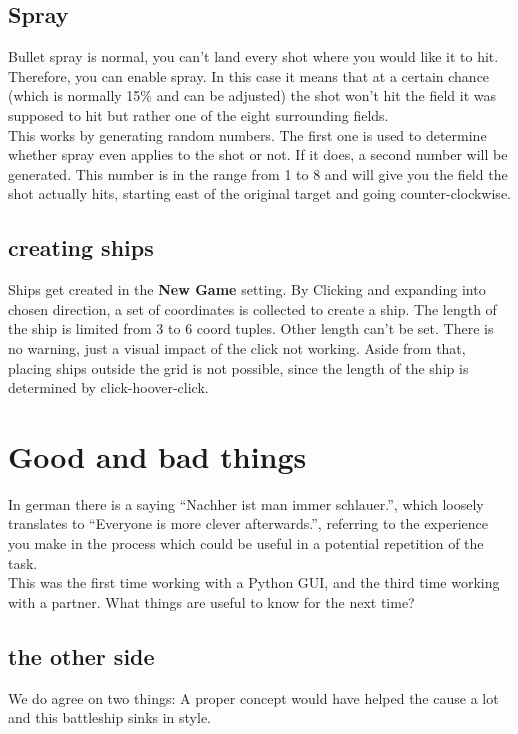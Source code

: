 \documentclass[12pt]{scrartcl}
\begin{document}
	\subsection{Spray}
	Bullet spray is normal, you can't land every shot where you would like it to hit. Therefore, you can enable spray. In this case it means that at a certain chance (which is normally 15\% and can be adjusted) the shot won't hit the field it was supposed to hit but rather one of the eight surrounding fields. \\
	This works by generating random numbers. The first one is used to determine whether spray even applies to the shot or not. If it does, a second number will be generated. This number is in the range from 1 to 8 and will give you the field the shot actually hits, starting east of the original target and going counter-clockwise.
	
	\subsection{creating ships}
	Ships get created in the \textbf{New Game } setting. By Clicking and expanding into chosen direction, a set of coordinates is collected to create a ship. The length of the ship is limited from 3 to 6 coord tuples. Other length can't be set. There is no warning, just a visual impact of the click not working. Aside from that, placing ships outside the grid is not possible, since the length of the ship is determined by click-hoover-click.
	\clearpage


	\section{Good and bad things}\label{sec:good_and_bad_things}
	In german there is a saying \enquote{Nachher ist man immer schlauer.}, which loosely translates to \enquote{Everyone is more clever afterwards.}, referring to the experience you make in the process which could be useful in a potential repetition of the task.\\
	This was the first time working with a Python GUI, and the third time working with a partner. What things are useful to know for the next time? \\
	\subsection{the other side}
	We do agree on two things: A proper concept would have helped the cause a lot and this battleship sinks in style.
\end{document}
